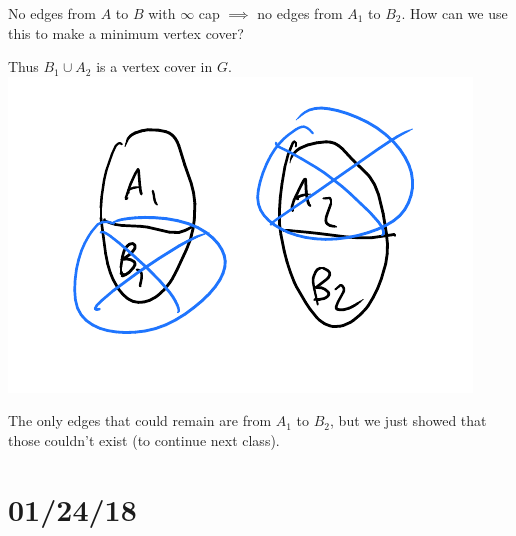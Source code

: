 \documentclass[12 pt]{article}
\begin{document}
        No edges from $A$ to $B$ with $\infty$ cap $\implies$ no edges
        from $A_1$ to $B_2$. How can we use this to make a minimum
        vertex cover?

        Thus $B_1 \cup A_2$ is a vertex cover in $G$.
        \\ \includegraphics[width=.9\textwidth]{i60.pdf}

        The only edges that could remain are from $A_1$ to $B_2$, but
        we just showed that those couldn't exist (to continue next class).
        \section{01/24/18}
\end{document}
